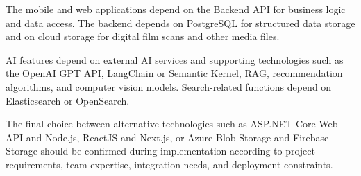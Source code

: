 The mobile and web applications depend on the Backend API for
business logic and data access. The backend depends on PostgreSQL
for structured data storage and on cloud storage for digital film
scans and other media files.

AI features depend on external AI services and supporting
technologies such as the OpenAI GPT API, LangChain or Semantic
Kernel, RAG, recommendation algorithms, and computer vision
models. Search-related functions depend on Elasticsearch or
OpenSearch.

The final choice between alternative technologies such as
ASP.NET Core Web API and Node.js, ReactJS and Next.js, or
Azure Blob Storage and Firebase Storage should be confirmed
during implementation according to project requirements,
team expertise, integration needs, and deployment constraints.

